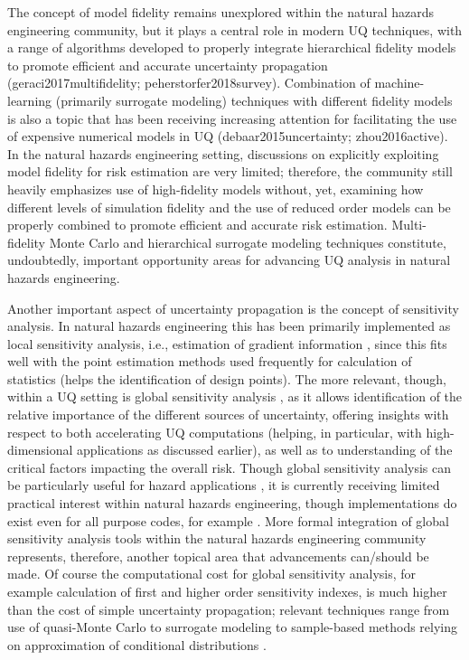 The concept of model fidelity remains unexplored within the natural hazards engineering community, but it plays a central role in modern UQ techniques, with a range of algorithms developed to properly integrate hierarchical fidelity models to promote efficient and accurate uncertainty propagation (geraci2017multifidelity; peherstorfer2018survey). Combination of machine-learning (primarily surrogate modeling) techniques with different fidelity models is also a topic that has been receiving increasing attention for facilitating the use of expensive numerical models in UQ (debaar2015uncertainty; zhou2016active). In the natural hazards engineering setting, discussions on explicitly exploiting model fidelity for risk estimation are very limited; therefore, the community still heavily emphasizes use of high-fidelity models without, yet, examining how different levels of simulation fidelity and the use of reduced order models can be properly combined to promote efficient and accurate risk estimation. Multi-fidelity Monte Carlo and hierarchical surrogate modeling techniques constitute, undoubtedly, important opportunity areas for advancing UQ analysis in natural hazards engineering.

Another important aspect of uncertainty propagation is the concept of sensitivity analysis. In natural hazards engineering this has been primarily implemented as local sensitivity analysis, i.e., estimation of gradient information \citep{haukaas2007methods,gu2009finite},  since this fits well with the point estimation methods used frequently for calculation of statistics (helps the identification of design points). The more relevant, though, within a UQ setting is global sensitivity analysis \citep{sobol1990sensitivity,saltelli2002making,rahman2016fsensitivity}, as it allows identification of the relative importance of the different sources of uncertainty, offering insights with respect to both accelerating UQ computations (helping, in particular, with high-dimensional applications as discussed earlier), as well as to understanding of the critical factors impacting the overall risk. Though global sensitivity analysis can be particularly useful for hazard applications \citep{vetter2012global}, it is currently receiving limited practical interest within natural hazards engineering, though implementations do exist even for all purpose codes, for example \citep{bourinet2009review}. More formal integration of global sensitivity analysis tools within the natural hazards engineering community represents, therefore, another topical area that advancements can/should be made. Of course the computational cost for global sensitivity analysis, for example calculation of first and higher order sensitivity indexes, is much higher than the cost of simple uncertainty propagation; relevant techniques range from use of quasi-Monte Carlo \citep{saltelli2002making} to surrogate modeling \citep{sudret2008global} to sample-based methods relying on approximation of conditional distributions \citep{li2016efficient,hu2019probability}.  

